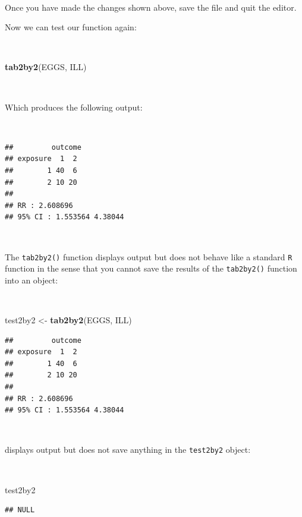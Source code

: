 \documentclass[12pt,a4paper]{book}
\newenvironment{Shaded}{\begin{snugshade}}{\end{snugshade}}
\newcommand{\KeywordTok}[1]{\textcolor[rgb]{0.13,0.29,0.53}{\textbf{#1}}}
\newcommand{\NormalTok}[1]{#1}
\newcommand{\StringTok}[1]{\textcolor[rgb]{0.31,0.60,0.02}{#1}}
\theoremstyle{definition}
\theoremstyle{definition}
\theoremstyle{definition}
\theoremstyle{remark}
\begin{document}
~

Once you have made the changes shown above, save the file and quit the
editor.

\newpage

Now we can test our function again:

~

\begin{Shaded}
\begin{Highlighting}[]
\KeywordTok{tab2by2}\NormalTok{(EGGS, ILL)}
\end{Highlighting}
\end{Shaded}

~

Which produces the following output:

~

\begin{verbatim}
##         outcome
## exposure  1  2
##        1 40  6
##        2 10 20
## 
## RR : 2.608696 
## 95% CI : 1.553564 4.38044
\end{verbatim}

~

The \texttt{tab2by2()} function displays output but does not behave like
a standard \texttt{R} function in the sense that you cannot save the
results of the \texttt{tab2by2()} function into an object:

~

\begin{Shaded}
\begin{Highlighting}[]
\NormalTok{test2by2 <-}\StringTok{ }\KeywordTok{tab2by2}\NormalTok{(EGGS, ILL)}
\end{Highlighting}
\end{Shaded}

\begin{verbatim}
##         outcome
## exposure  1  2
##        1 40  6
##        2 10 20
## 
## RR : 2.608696 
## 95% CI : 1.553564 4.38044
\end{verbatim}

~

displays output but does not save anything in the \texttt{test2by2}
object:

~

\begin{Shaded}
\begin{Highlighting}[]
\NormalTok{test2by2}
\end{Highlighting}
\end{Shaded}

\begin{verbatim}
## NULL
\end{verbatim}
\end{document}
